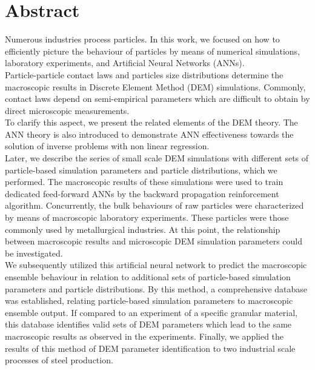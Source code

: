 \chapter*{Abstract}
\label{cap:abstract}

Numerous industries process particles.
In this work, we focused on how to efficiently picture the behaviour of
particles by means of numerical simulations, laboratory experiments, 
and Artificial Neural Networks (ANNs).\\
Particle-particle contact laws and particles size distributions determine the
macroscopic results in Discrete Element Method (DEM) simulations. 
Commonly, contact laws depend on semi-empirical parameters which 
are difficult to obtain by direct microscopic measurements. \\
To clarify this aspect, we present the related elements of the DEM
theory.
The ANN theory is also introduced to demonstrate ANN effectiveness towards
the solution of inverse problems with non linear regression.\\
Later, we describe the series of small scale DEM simulations with different sets
of particle-based simulation parameters and particle distributions, which we
performed.
The macroscopic results of these simulations were used to train dedicated
feed-forward ANNs by the backward propagation reinforcement algorithm.
Concurrently, the bulk behaviours of raw particles were characterized by means
of macroscopic laboratory experiments. These particles were those commonly used
by metallurgical industries.
At this point, the relationship between macroscopic results and microscopic DEM
simulation parameters could be investigated.\\
We subsequently utilized this artificial neural network to predict the
macroscopic ensemble behaviour in relation to additional sets of particle-based simulation parameters and particle distributions. 
By this method, a comprehensive database was established, relating particle-based 
simulation parameters to macroscopic ensemble output.
If compared to an experiment of a specific granular material, this database identifies 
valid sets of DEM parameters which lead to the same macroscopic results as observed in the experiments.
Finally, we applied the results of this method of DEM parameter identification
to two industrial scale processes of steel production.
